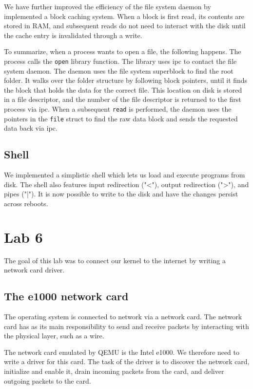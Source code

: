 \documentclass{article}
\begin{document}
We have further improved the efficiency of the file system daemon by
implemented a block caching system. When a block is first read, its contents
are stored in RAM, and subsequent reads do not need to interact with the disk
until the cache entry is invalidated through a write.



To summarize, when a process wants to open a file, the following happens. The
process calls the \texttt{open} library function. The library uses \gls{ipc}
to contact the file system daemon. The daemon uses the file system superblock
to find the root folder. It walks over the folder structure by following block
pointers, until it finds the block that holds the data for the correct file.
This location on disk is stored in a file descriptor, and the number of the
file descriptor is returned to the first process via \gls{ipc}. When a
subsequent \texttt{read} is performed, the daemon uses the pointers in the
\texttt{file} struct to find the raw data block and sends the requested data
back via \gls{ipc}.



\subsection{Shell}
We implemented a simplistic shell which lets us load and execute programs from
disk. The shell also features input redirection ("<"), output redirection
(">"), and pipes ("|"). It is now possible to write to the disk and have the
changes persist across reboots.




\section{Lab 6}
The goal of this lab was to connect our kernel to the internet by writing a
network card driver.

\subsection{The e1000 network card}
The operating system is connected to network via a network card. The network
card has as its main responsibility to send and receive packets by interacting
with the physical layer, such as a wire.

The network card emulated by QEMU is the Intel e1000. We therefore need to
write a driver for this card. The task of the driver is to discover the
network card, initialize and enable it, drain incoming packets from the card,
and deliver outgoing packets to the card.
\end{document}
